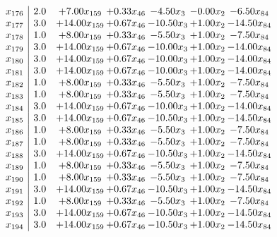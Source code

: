 \documentclass[8pt]{article}
\begin{document}
\[\begin{array}{c| c c@{\hskip 2pt} c@{\hskip 2pt} c@{\hskip 2pt} c@{\hskip 2pt} c@{\hskip 2pt} }
 x_{176}   &  2.0 & +  7.00 x_{159} & +  0.33 x_{46} & -4.50 x_{3} & -0.00 x_{2} & -6.50 x_{84}\\
 x_{177}   &  3.0 & + 14.00 x_{159} & +  0.67 x_{46} & -10.50 x_{3} & +  1.00 x_{2} & -14.50 x_{84}\\
 x_{178}   &  1.0 & +  8.00 x_{159} & +  0.33 x_{46} & -5.50 x_{3} & +  1.00 x_{2} & -7.50 x_{84}\\
 x_{179}   &  3.0 & + 14.00 x_{159} & +  0.67 x_{46} & -10.00 x_{3} & +  1.00 x_{2} & -14.00 x_{84}\\
 x_{180}   &  3.0 & + 14.00 x_{159} & +  0.67 x_{46} & -10.00 x_{3} & +  1.00 x_{2} & -14.00 x_{84}\\
 x_{181}   &  3.0 & + 14.00 x_{159} & +  0.67 x_{46} & -10.00 x_{3} & +  1.00 x_{2} & -14.00 x_{84}\\
 x_{182}   &  1.0 & +  8.00 x_{159} & +  0.33 x_{46} & -5.50 x_{3} & +  1.00 x_{2} & -7.50 x_{84}\\
 x_{183}   &  1.0 & +  8.00 x_{159} & +  0.33 x_{46} & -5.50 x_{3} & +  1.00 x_{2} & -7.50 x_{84}\\
 x_{184}   &  3.0 & + 14.00 x_{159} & +  0.67 x_{46} & -10.00 x_{3} & +  1.00 x_{2} & -14.00 x_{84}\\
 x_{185}   &  3.0 & + 14.00 x_{159} & +  0.67 x_{46} & -10.50 x_{3} & +  1.00 x_{2} & -14.50 x_{84}\\
 x_{186}   &  1.0 & +  8.00 x_{159} & +  0.33 x_{46} & -5.50 x_{3} & +  1.00 x_{2} & -7.50 x_{84}\\
 x_{187}   &  1.0 & +  8.00 x_{159} & +  0.33 x_{46} & -5.50 x_{3} & +  1.00 x_{2} & -7.50 x_{84}\\
 x_{188}   &  3.0 & + 14.00 x_{159} & +  0.67 x_{46} & -10.50 x_{3} & +  1.00 x_{2} & -14.50 x_{84}\\
 x_{189}   &  1.0 & +  8.00 x_{159} & +  0.33 x_{46} & -5.50 x_{3} & +  1.00 x_{2} & -7.50 x_{84}\\
 x_{190}   &  1.0 & +  8.00 x_{159} & +  0.33 x_{46} & -5.50 x_{3} & +  1.00 x_{2} & -7.50 x_{84}\\
 x_{191}   &  3.0 & + 14.00 x_{159} & +  0.67 x_{46} & -10.50 x_{3} & +  1.00 x_{2} & -14.50 x_{84}\\
 x_{192}   &  1.0 & +  8.00 x_{159} & +  0.33 x_{46} & -5.50 x_{3} & +  1.00 x_{2} & -7.50 x_{84}\\
 x_{193}   &  3.0 & + 14.00 x_{159} & +  0.67 x_{46} & -10.50 x_{3} & +  1.00 x_{2} & -14.50 x_{84}\\
 x_{194}   &  3.0 & + 14.00 x_{159} & +  0.67 x_{46} & -10.50 x_{3} & +  1.00 x_{2} & -14.50 x_{84}\\

\end{array}\]
\end{document}
